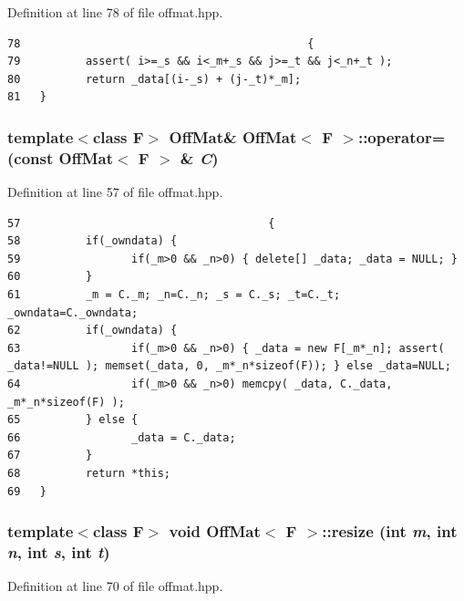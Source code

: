 Definition at line 78 of file offmat.hpp.

\footnotesize\begin{verbatim}78                                            {
79          assert( i>=_s && i<_m+_s && j>=_t && j<_n+_t );
80          return _data[(i-_s) + (j-_t)*_m];
81   }
\end{verbatim}\normalsize 


\subsubsection{\setlength{\rightskip}{0pt plus 5cm}template$<$class F$>$ {\bf Off\-Mat}\& {\bf Off\-Mat}$<$ F $>$::operator= (const {\bf Off\-Mat}$<$ F $>$ \& {\em C})\hspace{0.3cm}{\tt  [inline]}}\label{classOffMat_eabbbf42ac0246befc8c8904ecb1977d_eabbbf42ac0246befc8c8904ecb1977d}




Definition at line 57 of file offmat.hpp.

\footnotesize\begin{verbatim}57                                      {
58          if(_owndata) { 
59                 if(_m>0 && _n>0) { delete[] _data; _data = NULL; } 
60          }
61          _m = C._m; _n=C._n; _s = C._s; _t=C._t; _owndata=C._owndata;
62          if(_owndata) {
63                 if(_m>0 && _n>0) { _data = new F[_m*_n]; assert( _data!=NULL ); memset(_data, 0, _m*_n*sizeof(F)); } else _data=NULL;
64                 if(_m>0 && _n>0) memcpy( _data, C._data, _m*_n*sizeof(F) );
65          } else {
66                 _data = C._data;
67          }
68          return *this;
69   }
\end{verbatim}\normalsize 


\subsubsection{\setlength{\rightskip}{0pt plus 5cm}template$<$class F$>$ void {\bf Off\-Mat}$<$ F $>$::resize (int {\em m}, int {\em n}, int {\em s}, int {\em t})\hspace{0.3cm}{\tt  [inline]}}\label{classOffMat_c18b6f68674e19e5a8222e14d33b8156_c18b6f68674e19e5a8222e14d33b8156}




Definition at line 70 of file offmat.hpp.

